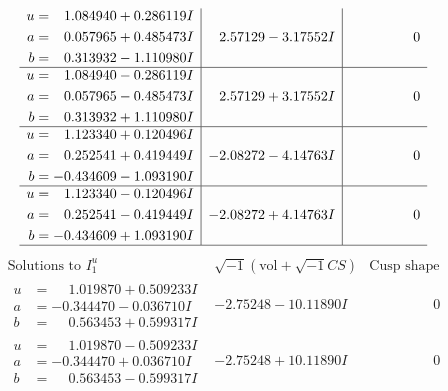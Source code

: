 \documentclass[1p]{elsarticle_modified}
\theoremstyle{definition}
\newcommand{\I}{\sqrt{-1}}
\begin{document}
$$\begin{array}{c|c|c}
\begin{aligned}
u &= \phantom{-}1.084940 + 0.286119 I \\
a &= \phantom{-}0.057965 + 0.485473 I \\
b &= \phantom{-}0.313932 - 1.110980 I\end{aligned}
 & \phantom{-}2.57129 - 3.17552 I & \phantom{-0.000000 } 0 \\ \hline\begin{aligned}
u &= \phantom{-}1.084940 - 0.286119 I \\
a &= \phantom{-}0.057965 - 0.485473 I \\
b &= \phantom{-}0.313932 + 1.110980 I\end{aligned}
 & \phantom{-}2.57129 + 3.17552 I & \phantom{-0.000000 } 0 \\ \hline\begin{aligned}
u &= \phantom{-}1.123340 + 0.120496 I \\
a &= \phantom{-}0.252541 + 0.419449 I \\
b &= -0.434609 - 1.093190 I\end{aligned}
 & -2.08272 - 4.14763 I & \phantom{-0.000000 } 0 \\ \hline\begin{aligned}
u &= \phantom{-}1.123340 - 0.120496 I \\
a &= \phantom{-}0.252541 - 0.419449 I \\
b &= -0.434609 + 1.093190 I\end{aligned}
 & -2.08272 + 4.14763 I & \phantom{-0.000000 } 0\\
 \hline 
 \end{array}$$\newpage$$\begin{array}{c|c|c}  
\text{Solutions to }I^u_{1}& \I (\text{vol} + \sqrt{-1}CS) & \text{Cusp shape}\\
 \hline 
\begin{aligned}
u &= \phantom{-}1.019870 + 0.509233 I \\
a &= -0.344470 - 0.036710 I \\
b &= \phantom{-}0.563453 + 0.599317 I\end{aligned}
 & -2.75248 - 10.11890 I & \phantom{-0.000000 } 0 \\ \hline\begin{aligned}
u &= \phantom{-}1.019870 - 0.509233 I \\
a &= -0.344470 + 0.036710 I \\
b &= \phantom{-}0.563453 - 0.599317 I\end{aligned}
 & -2.75248 + 10.11890 I & \phantom{-0.000000 } 0 \\ \hline\begin{aligned}

\end{aligned}
\end{array}$$
\end{document}
